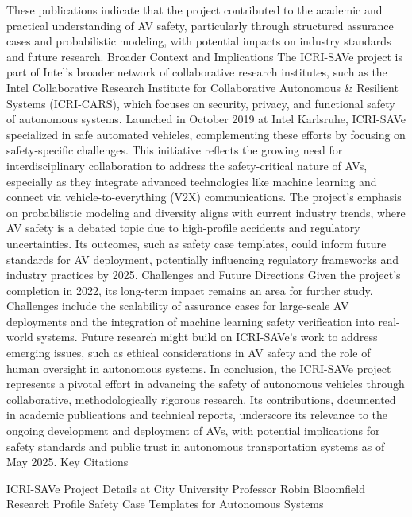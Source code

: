 These publications indicate that the project contributed to the academic and practical understanding of AV safety, particularly through structured assurance cases and probabilistic modeling, with potential impacts on industry standards and future research.
Broader Context and Implications
The ICRI-SAVe project is part of Intel's broader network of collaborative research institutes, such as the Intel Collaborative Research Institute for Collaborative Autonomous & Resilient Systems (ICRI-CARS), which focuses on security, privacy, and functional safety of autonomous systems. Launched in October 2019 at Intel Karlsruhe, ICRI-SAVe specialized in safe automated vehicles, complementing these efforts by focusing on safety-specific challenges. This initiative reflects the growing need for interdisciplinary collaboration to address the safety-critical nature of AVs, especially as they integrate advanced technologies like machine learning and connect via vehicle-to-everything (V2X) communications.
The project's emphasis on probabilistic modeling and diversity aligns with current industry trends, where AV safety is a debated topic due to high-profile accidents and regulatory uncertainties. Its outcomes, such as safety case templates, could inform future standards for AV deployment, potentially influencing regulatory frameworks and industry practices by 2025.
Challenges and Future Directions
Given the project's completion in 2022, its long-term impact remains an area for further study. Challenges include the scalability of assurance cases for large-scale AV deployments and the integration of machine learning safety verification into real-world systems. Future research might build on ICRI-SAVe's work to address emerging issues, such as ethical considerations in AV safety and the role of human oversight in autonomous systems.
In conclusion, the ICRI-SAVe project represents a pivotal effort in advancing the safety of autonomous vehicles through collaborative, methodologically rigorous research. Its contributions, documented in academic publications and technical reports, underscore its relevance to the ongoing development and deployment of AVs, with potential implications for safety standards and public trust in autonomous transportation systems as of May 2025.
Key Citations

    ICRI-SAVe Project Details at City University
    Professor Robin Bloomfield Research Profile
    Safety Case Templates for Autonomous Systems


